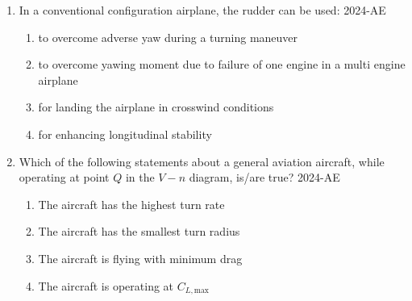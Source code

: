 \documentclass[journal]{IEEEtran}
\begin{document}
\begin{enumerate}
    \item In a conventional configuration airplane, the rudder can be used:
    \hfill{2024-AE}
    \begin{enumerate}
        \item to overcome adverse yaw during a turning maneuver
        \item to overcome yawing moment due to failure of one engine in a multi engine airplane
        \item for landing the airplane in crosswind conditions
        \item for enhancing longitudinal stability
    \end{enumerate}

    \item Which of the following statements about a general aviation aircraft, while operating at point $Q$ in the $V-n$ diagram, is/are true?
 \hfill{2024-AE}



    \begin{enumerate}
        \item The aircraft has the highest turn rate
        \item The aircraft has the smallest turn radius
        \item The aircraft is flying with minimum drag
        \item The aircraft is operating at $C_{L,\text{max}}$
    \end{enumerate}


\end{enumerate}
\end{document}
